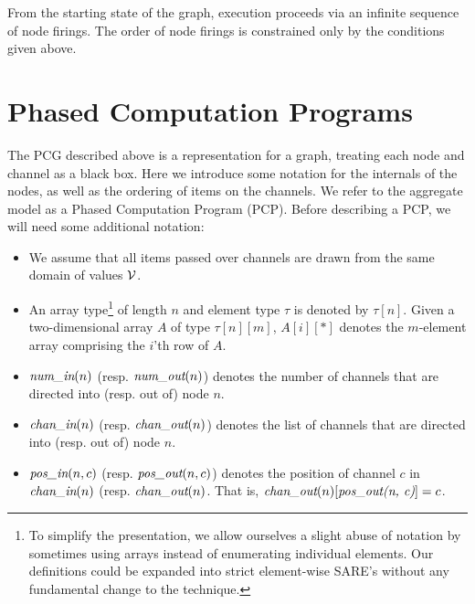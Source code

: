 From the starting state of the graph, execution proceeds via an
infinite sequence of node firings.  The order of node firings is
constrained only by the conditions given above.

\section{Phased Computation Programs}

The PCG described above is a representation for a graph, treating each
node and channel as a black box.  Here we introduce some notation for
the internals of the nodes, as well as the ordering of items on the
channels.  We refer to the aggregate model as a Phased Computation
Program (PCP).  Before describing a PCP, we will need some additional
notation:
\begin{itemize}

\item We assume that all items passed over channels are drawn from the
same domain of values ${\cal V}$.

\item An array type\footnote{To simplify the presentation, we allow
ourselves a slight abuse of notation by sometimes using arrays instead
of enumerating individual elements.  Our definitions could be expanded
into strict element-wise SARE's without any fundamental change to the
technique.} of length $n$ and element type $\tau$ is denoted by
$\tau[n]$.  Given a two-dimensional array $A$ of type $\tau[n][m]$,
$A[i][*]$ denotes the $m$-element array comprising the $i$'th row of
$A$.

\item $\mbox{\it num\_in}(n)$ (resp. $\mbox{\it num\_out}(n)$) denotes the number of
channels that are directed into (resp. out of) node $n$.

\item $\mbox{\it chan\_in}(n)$ (resp. $\mbox{\it chan\_out}(n)$) denotes the list of
channels that are directed into (resp. out of) node $n$.

\item $\mbox{\it pos\_in}(n, c)$ (resp. $\mbox{\it pos\_out}(n, c)$) denotes the
position of channel $c$ in $\mbox{\it chan\_in}(n)$
(resp. $\mbox{\it chan\_out}(n)$.  That is, $\mbox{\it chan\_out}(n)[\mbox{\it pos\_out(n,
c)}] = c$.

\end{itemize}

